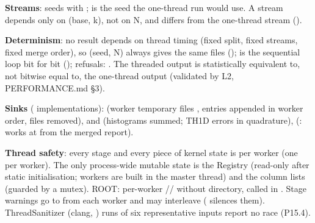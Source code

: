 \textbf{Streams}:  seeds  with ;  is the seed the one-thread run would use. A stream
depends only on (base, k), not on N, and differs from the one-thread stream ().

\textbf{Determinism}: no result depends on thread timing (fixed split, fixed streams, fixed merge order), so (seed, N) always
gives the same files ();  is the sequential loop bit for bit
(); refusals: . The threaded output is statistically equivalent to, not
bitwise equal to, the one-thread output (validated by L2, PERFORMANCE.md §3).

\textbf{Sinks} ( implementations):  (worker temporary files , entries
appended in worker order, files removed),  and  (histograms summed; TH1D errors in
quadrature),\allowbreak{}  (: works at  from the merged report).

\textbf{Thread safety}: every stage and every piece of kernel state is per worker (one  per worker). The only
process-wide mutable state is the Registry (read-only after static initialisation; workers are built in the master
thread) and the  column lists (guarded by a mutex). ROOT: per-worker // without
directory,  called in . Stage warnings go to
 from each worker and may interleave ( silences them). ThreadSanitizer (clang, )
runs of six representative inputs report no race (P15.4).

